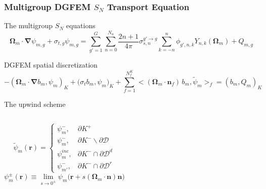\documentclass[compress,10pt]{beamer}
\renewcommand{\vec}[1]{\mathbf{#1}}
\begin{document}
\begin{frame}[t]\frametitle{Multigroup DGFEM $S_N$ Transport Equation}{\small
\begin{block}{The multigroup $S_N$ equations}
\begin{equation*}
\vec{\Omega}_m \cdot \vec{\nabla} \psi_{m,g} + \sigma_{t,g} \psi_{m,g} = \sum_{g'=1}^{G} \sum_{n=0}^{N_a} \frac{2n+1}{4 \pi} \sigma_{s,n}^{g' \rightarrow g} \sum_{k=-n}^{n} \phi_{g',n,k} Y_{n,k} (\vec{\Omega}_m) + Q_{m,g}
\end{equation*}
\end{block}
{
\begin{block}{DGFEM spatial discretization}
\begin{equation*}
- \left( \vec{\Omega}_m \cdot  \vec{\nabla} b_m, \psi_{m} \right)_{K} + \Big(  \sigma_{t} b_m ,   \psi_{m} \Big)_{K}  + \sum_{f=1}^{N_f^K} \Big< ( \vec{\Omega}_m \cdot \vec{n}_f ) \, b_m, \tilde{\psi}_m  \Big>_{f}  = \left(  b_m ,   Q_m \right)_{K}
\end{equation*}
\end{block}
\begin{block}{The upwind scheme}{\small
\vspace{-2mm}
\begin{columns}
\centering
\begin{equation*}
\tilde{\psi}_m (\vec{r})  = 
\begin{cases}
\psi_m^{-} , & \partial K^+ \\
\psi_m^{-}, & \partial K^- \backslash \partial \mathcal{D} \\
\psi_m^{inc}, & \partial K^- \cap \partial \mathcal{D}^d \\
\psi_{m'}^{-}, & \partial K^- \cap \partial \mathcal{D}^r
\end{cases}
\end{equation*}
\centering
\begin{equation*}
\psi_m^{\pm} (\vec{r}) \equiv \lim_{s \rightarrow 0^{\pm}} \psi_m \Big( \vec{r} + s (\vec{\Omega}_m \cdot \vec{n}) \vec{n} \Big)
\end{equation*}
\end{columns}
}\end{block}
}
}\end{frame}
\end{document}
